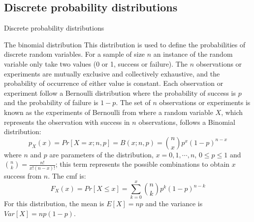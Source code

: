\documentclass[8pt]{beamer}
\renewcommand{\emph}[1]{\textcolor{myorange}{#1}}
\begin{document}
\subsection{Discrete probability distributions} %
\begin{frame}{Discrete probability distributions}

    \begin{block}{The \alert{binomial} distribution}
        This distribution is used to define the probabilities of discrete random variables. For a sample of size $n$ an instance of the random variable only take two values (0 or 1, success or failure). The $n$ observations or experiments are mutually exclusive and collectively exhaustive, and the probability of occurrence of either value is constant. Each observation or experiment follow a \alert{Bernoulli distribution} where the probability of success is $p$ and the probability of failure is $1-p$. The set of $n$ observations or experiments is known as the experiments of Bernoulli from where a random variable $X$, which represents the observation with success in $n$ observations, follows a \alert{Binomial distribution}:
        \[
            p_X (x) = Pr[X = x; n,p] = B(x;n,p) = \binom{n}{x} p^x (1-p)^{n-x}
        \]
        where $n$ and $p$ are parameters of the distribution, $x=0,1,\cdots, n$, $0 \leq p \leq 1$ and $\binom{n}{k}=\frac{n!}{x! (n-x)!}$; this term represents the possible combinations to obtain $x$ success from $n$. The \emph{cmf} is:
        \[
            F_X (x) = Pr[X\leq x] = \sum_{k=0}^x \binom{n}{k} p^k (1-p)^{n-k}
        \]
        For this distribution, the mean is $E[X] = np$ and the variance is $Var[X] = np(1-p)$.
    \end{block}
    \end{frame}
\end{document}
